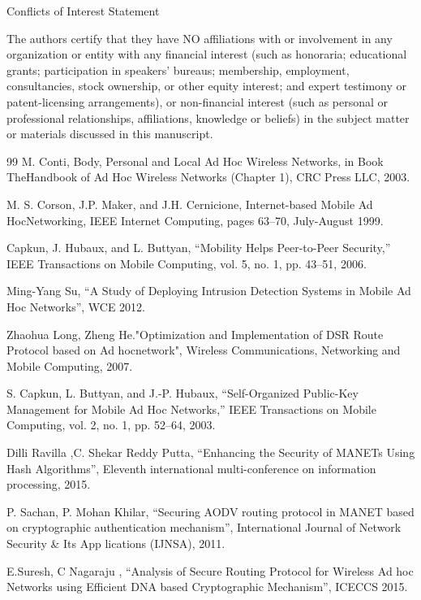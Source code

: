 \documentclass{default}
\begin{document}
Conflicts of Interest Statement

The authors certify that they have NO affiliations with or involvement in any organization or entity with any financial interest (such as honoraria; educational grants; participation in speakers’ bureaus; membership, employment, consultancies, stock ownership, or other equity interest; and expert testimony or patent-licensing arrangements), or non-financial interest (such as personal or professional relationships, affiliations, knowledge or beliefs) in the subject matter or materials discussed in this manuscript.

\begin{thebibliography}{99}
M. Conti, Body, Personal and Local Ad Hoc Wireless Networks, in Book TheHandbook of Ad Hoc Wireless Networks (Chapter 1), CRC Press LLC, 2003.

M. S. Corson, J.P. Maker, and J.H. Cernicione, Internet-based Mobile Ad HocNetworking, IEEE Internet Computing, pages 63–70, July-August 1999.

Capkun, J. Hubaux, and L. Buttyan, “Mobility Helps Peer-to-Peer Security,” IEEE Transactions on Mobile Computing, vol. 5, no. 1, pp. 43–51, 2006.

Ming-Yang Su, “A Study of Deploying Intrusion Detection Systems in Mobile Ad Hoc Networks”, WCE 2012.

Zhaohua Long, Zheng He."Optimization and Implementation of DSR Route Protocol based on Ad hocnetwork", Wireless Communications, Networking and Mobile Computing, 2007.

S. Capkun, L. Buttyan, and J.-P. Hubaux, “Self-Organized Public-Key Management for Mobile Ad Hoc Networks,” IEEE Transactions on Mobile Computing, vol. 2, no. 1, pp. 52–64, 2003.

Dilli Ravilla ,C. Shekar Reddy Putta, “Enhancing the Security of MANETs Using Hash Algorithms”, Eleventh international multi-conference on information processing, 2015.

P. Sachan, P. Mohan Khilar, “Securing AODV routing protocol in MANET based on cryptographic authentication mechanism”, International Journal of Network Security \& Its App lications (IJNSA), 2011.

E.Suresh, C Nagaraju , “Analysis of Secure Routing Protocol for Wireless Ad hoc Networks using Efficient DNA based Cryptographic Mechanism”, ICECCS 2015.


\end{thebibliography}
\end{document}
